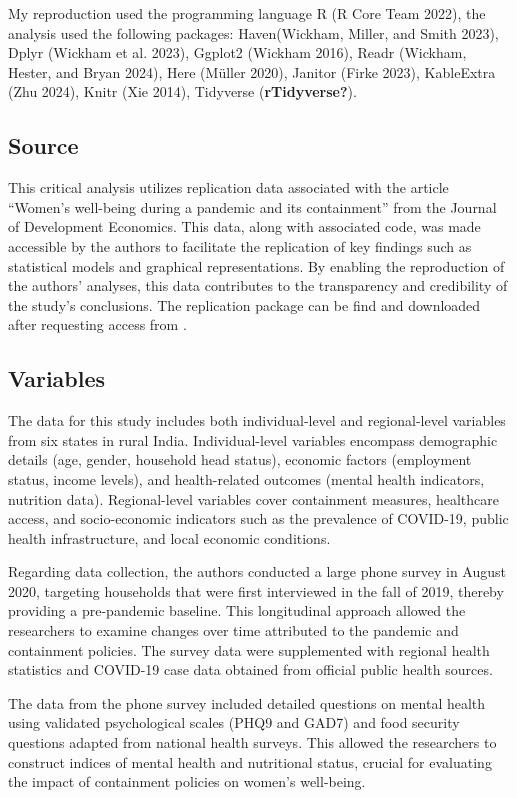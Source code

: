 \documentclass[
  letterpaper,
  DIV=11,
  numbers=noendperiod]{scrartcl}
\begin{document}
My reproduction used the programming language R (R Core Team 2022), the
analysis used the following packages: Haven(Wickham, Miller, and Smith
2023), Dplyr (Wickham et al. 2023), Ggplot2 (Wickham 2016), Readr
(Wickham, Hester, and Bryan 2024), Here (Müller 2020), Janitor (Firke
2023), KableExtra (Zhu 2024), Knitr (Xie 2014), Tidyverse
(\textbf{rTidyverse?}).

\subsection{Source}\label{source}

This critical analysis utilizes replication data associated with the
article ``Women's well-being during a pandemic and its containment''
from the Journal of Development Economics. This data, along with
associated code, was made accessible by the authors to facilitate the
replication of key findings such as statistical models and graphical
representations. By enabling the reproduction of the authors' analyses,
this data contributes to the transparency and credibility of the study's
conclusions. The replication package can be find and downloaded after
requesting access from .

\subsection{Variables}\label{variables}

The data for this study includes both individual-level and
regional-level variables from six states in rural India.
Individual-level variables encompass demographic details (age, gender,
household head status), economic factors (employment status, income
levels), and health-related outcomes (mental health indicators,
nutrition data). Regional-level variables cover containment measures,
healthcare access, and socio-economic indicators such as the prevalence
of COVID-19, public health infrastructure, and local economic
conditions.

Regarding data collection, the authors conducted a large phone survey in
August 2020, targeting households that were first interviewed in the
fall of 2019, thereby providing a pre-pandemic baseline. This
longitudinal approach allowed the researchers to examine changes over
time attributed to the pandemic and containment policies. The survey
data were supplemented with regional health statistics and COVID-19 case
data obtained from official public health sources.

The data from the phone survey included detailed questions on mental
health using validated psychological scales (PHQ9 and GAD7) and food
security questions adapted from national health surveys. This allowed
the researchers to construct indices of mental health and nutritional
status, crucial for evaluating the impact of containment policies on
women's well-being.
\end{document}
